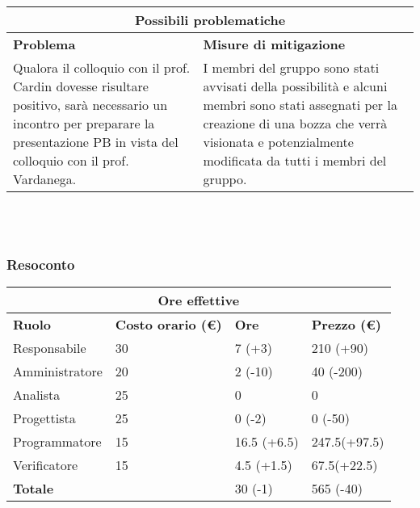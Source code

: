 \documentclass[a4paper, 12pt]{article}
\begin{document}
\begin{center}
    \begin{tabularx}{\textwidth}{|X|X|}
        \hline
        \multicolumn{2}{|c|}{\textbf{Possibili problematiche}}\\
        \hline
        \hline
        \textbf{Problema} & \textbf{Misure di mitigazione}\\
        \hline
        Qualora il colloquio con il prof. Cardin dovesse risultare positivo, sarà necessario un incontro per preparare la presentazione PB in vista del colloquio con il prof. Vardanega. & I membri del gruppo sono stati avvisati della possibilità e alcuni membri sono stati assegnati per la creazione di una bozza che verrà visionata e potenzialmente modificata da tutti i membri del gruppo.\\
        \hline
    \end{tabularx}\\[8pt]
    \mbox{}\\
\end{center}

\subsubsection{Resoconto}\mbox{}

\begin{center}
    \begin{tabularx}{\textwidth}{|X|X|X|X|}
        \hline
        \multicolumn{4}{|c|}{\textbf{Ore effettive}}\\
        \hline
        \hline
        \textbf{Ruolo} & \textbf{Costo orario (\euro)} & \textbf{Ore} & \textbf{Prezzo (\euro)}\\
        \hline
        Responsabile    & 30 & 7 (+3)  & 210 (+90)\\
        \hline
        Amministratore  & 20 & 2 (-10)  & 40 (-200)\\
        \hline
        Analista        & 25 & 0  & 0\\
        \hline
        Progettista     & 25 & 0 (-2) & 0 (-50)\\
        \hline
        Programmatore   & 15 & 16.5 (+6.5)  & 247.5(+97.5)\\
        \hline
        Verificatore    & 15 & 4.5 (+1.5)  & 67.5(+22.5)\\
        \hline
        \hline
        \textbf{Totale} &    & 30 (-1) & 565 (-40)\\
        \hline
    \end{tabularx}\\[8pt]
    \mbox{}\\
\end{center}
\end{document}
